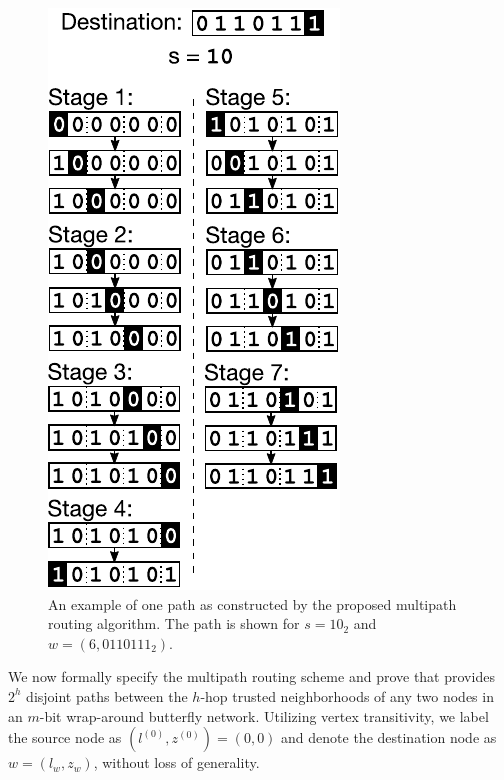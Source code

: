 \documentclass{sig-alternate-05-2015}
\begin{document}
\begin{figure}
\begin{center}
\includegraphics{fig-routing.pdf}
\end{center}
\caption{
An example of one path as constructed by the proposed multipath
routing algorithm.
The path is shown for $s = 10_2$
and $w = (6, 0110111_2)$.
\label{fig:routing}
}
\end{figure}

We now formally specify the multipath routing scheme and prove
that provides $2^h$ disjoint paths between
the $h$-hop trusted neighborhoods of any two nodes in an $m$-bit
wrap-around butterfly network.
Utilizing vertex transitivity, we label the source node as
$(l^{(0)}, z^{(0)}) = (0, 0)$ and denote the destination node as $w = (l_w, z_w)$,
without loss of generality.
\end{document}
